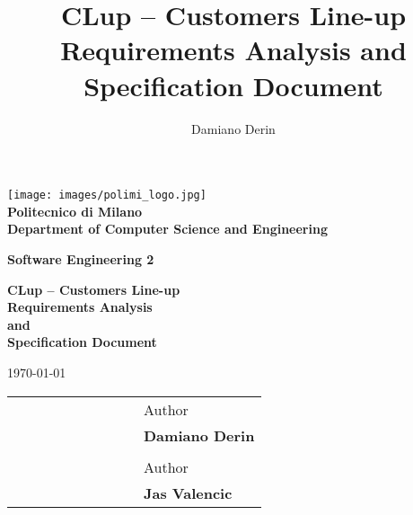 \title{CLup – Customers Line-up \\ Requirements Analysis and Specification Document}
\author{Damiano Derin}

\begin{titlepage}
    \begin{center}
    \BgThispage
    \texttt{[image: images/polimi\_logo.jpg]}\\
    {\LARGE {\bfseries Politecnico di Milano \\}}
    \vspace{.5cm}
    {\Large {\bfseries Department of Computer Science and Engineering \\}}
    \vspace{1.0cm}
    
    {\Large {\bfseries Software Engineering 2 \\}}
    \vspace{2.0cm}
    
    
    {\LARGE {\bfseries CLup – Customers Line-up \\
    	Requirements Analysis \\ and \\ Specification Document\\}}
    \vspace{1cm}

    {\large \today \\
    }


    \vfill
    \begin{table}[h]
        {\large
            \begin{tabular}{c c c c r c c | c c l}
                & & & & & & & & & Author \\
                & & & & & & & & & \bfseries Damiano Derin \\
                & & & & & & & & & \\
                & & & & & & & & & Author \\
                & & & & & & & & & \bfseries Jas Valencic \\
            \end{tabular}
        }
    \end{table}
    \vspace{1cm}
    \end{center}
\end{titlepage}

